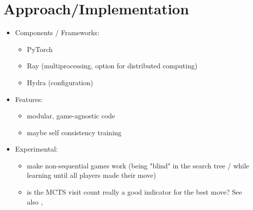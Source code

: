 \chapter{Approach/Implementation}
\label{approach}


\begin{itemize}
    \item Components / Frameworks:
    \begin{itemize}
        \item PyTorch
        \item Ray (multiprocessing, option for distributed computing) \cite{ray}
        \item Hydra (configuration) \cite{hydra}
    \end{itemize}
    \item Features:
    \begin{itemize}
        \item modular, game-agnostic code
        \item maybe self consistency training \cite{efficientzero}
    \end{itemize}
    \item Experimental:
    \begin{itemize}
        \item make non-sequential games work (being "blind" in the search tree /
        while learning until all players made their move)
        \item is the MCTS visit count really a good indicator for the
        best move?
        See also , 
    \end{itemize}
\end{itemize}

